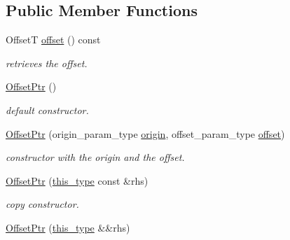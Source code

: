 \subsection*{Public Member Functions}
\begin{DoxyCompactItemize}
\item 
\hypertarget{classhryky_1_1_offset_ptr_ada822ff23d086dda31c0d4c1f6c9ebd5}{Offset\-T \hyperlink{classhryky_1_1_offset_ptr_ada822ff23d086dda31c0d4c1f6c9ebd5}{offset} () const }\label{classhryky_1_1_offset_ptr_ada822ff23d086dda31c0d4c1f6c9ebd5}

\begin{DoxyCompactList}\small\item\em retrieves the offset. \end{DoxyCompactList}\item 
\hypertarget{classhryky_1_1_offset_ptr_a81d4ed37b44fd74e8fb82f1e9c8a4814}{\hyperlink{classhryky_1_1_offset_ptr_a81d4ed37b44fd74e8fb82f1e9c8a4814}{Offset\-Ptr} ()}\label{classhryky_1_1_offset_ptr_a81d4ed37b44fd74e8fb82f1e9c8a4814}

\begin{DoxyCompactList}\small\item\em default constructor. \end{DoxyCompactList}\item 
\hypertarget{classhryky_1_1_offset_ptr_a7c4b76c5d859a5021cac4a0dcd96f88e}{\hyperlink{classhryky_1_1_offset_ptr_a7c4b76c5d859a5021cac4a0dcd96f88e}{Offset\-Ptr} (origin\-\_\-param\-\_\-type \hyperlink{classhryky_1_1_offset_ptr_af74f8eb3403a971a16440c7e1e164cbe}{origin}, offset\-\_\-param\-\_\-type \hyperlink{classhryky_1_1_offset_ptr_ada822ff23d086dda31c0d4c1f6c9ebd5}{offset})}\label{classhryky_1_1_offset_ptr_a7c4b76c5d859a5021cac4a0dcd96f88e}

\begin{DoxyCompactList}\small\item\em constructor with the origin and the offset. \end{DoxyCompactList}\item 
\hypertarget{classhryky_1_1_offset_ptr_a90d9540e04e9f55a5a56af20e8d6b96e}{\hyperlink{classhryky_1_1_offset_ptr_a90d9540e04e9f55a5a56af20e8d6b96e}{Offset\-Ptr} (\hyperlink{classhryky_1_1_offset_ptr_a73a85221d5352162be046159f4aea008}{this\-\_\-type} const \&rhs)}\label{classhryky_1_1_offset_ptr_a90d9540e04e9f55a5a56af20e8d6b96e}

\begin{DoxyCompactList}\small\item\em copy constructor. \end{DoxyCompactList}\item 
\hypertarget{classhryky_1_1_offset_ptr_a9aaecfa667ed21310eaa0e9a8c37441e}{\hyperlink{classhryky_1_1_offset_ptr_a9aaecfa667ed21310eaa0e9a8c37441e}{Offset\-Ptr} (\hyperlink{classhryky_1_1_offset_ptr_a73a85221d5352162be046159f4aea008}{this\-\_\-type} \&\&rhs)}\label{classhryky_1_1_offset_ptr_a9aaecfa667ed21310eaa0e9a8c37441e}


\end{DoxyCompactItemize}
